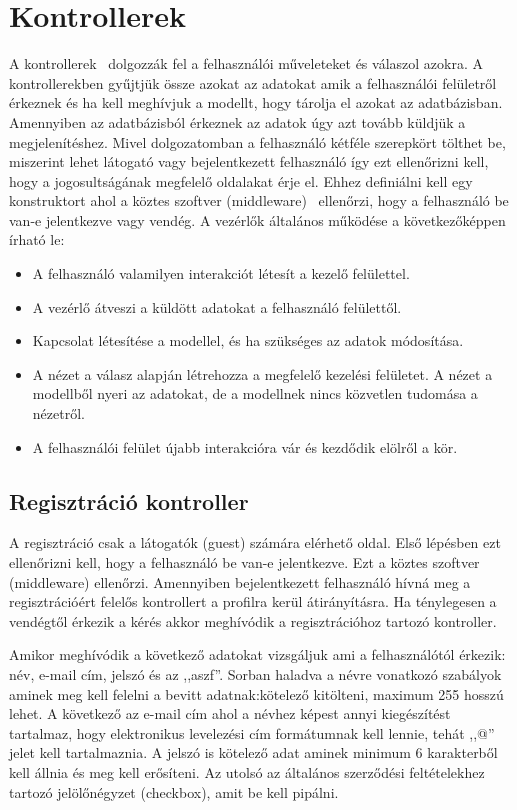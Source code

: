 \documentclass[
]{thesis-ekf}
\theoremstyle{definition}
\theoremstyle{remark}
\begin{document}
	\section{Kontrollerek}
	A kontrollerek~\cite{laravel_controller} dolgozzák fel a felhasználói műveleteket és válaszol azokra. A kontrollerekben gyűjtjük össze azokat az adatokat amik a felhasználói felületről érkeznek és ha kell meghívjuk a modellt, hogy tárolja el azokat az adatbázisban. Amennyiben az adatbázisból érkeznek az adatok úgy azt tovább küldjük a megjelenítéshez. Mivel dolgozatomban a felhasználó kétféle szerepkört tölthet be, miszerint lehet látogató vagy bejelentkezett felhasználó így ezt ellenőrizni kell, hogy a jogosultságának megfelelő oldalakat érje el. Ehhez definiálni kell egy konstruktort ahol a köztes szoftver (middleware)~\cite{laravel_middlewear} ellenőrzi, hogy a felhasználó be van-e jelentkezve vagy vendég.
	A vezérlők általános működése a következőképpen írható le:~\cite{controller_cicle}
	\begin{itemize}
		\item{A felhasználó valamilyen interakciót létesít a kezelő felülettel.}
		\item{A vezérlő átveszi a küldött adatokat a felhasználó felülettől.}
		\item{Kapcsolat létesítése a modellel, és ha szükséges az adatok módosítása.}
		\item{ A nézet a válasz alapján létrehozza a megfelelő kezelési felületet. A nézet a modellből nyeri az adatokat, de a modellnek nincs közvetlen tudomása a nézetről.}
		\item{A felhasználói felület újabb interakcióra vár és kezdődik elölről a kör.}
	\end{itemize}
	
	\subsection{Regisztráció kontroller}
	A regisztráció csak a látogatók (guest) számára elérhető oldal. Első lépésben ezt ellenőrizni kell, hogy a felhasználó be van-e jelentkezve. Ezt a köztes szoftver (middleware) ellenőrzi. Amennyiben bejelentkezett felhasználó hívná meg a regisztrációért felelős kontrollert a profilra kerül átirányításra. Ha ténylegesen a vendégtől érkezik a kérés akkor meghívódik a regisztrációhoz tartozó kontroller.  
	
	Amikor meghívódik a következő adatokat vizsgáljuk ami a felhasználótól érkezik: név, e-mail cím, jelszó és az ,,aszf''.
	Sorban haladva a névre vonatkozó szabályok aminek meg kell felelni a bevitt adatnak:kötelező kitölteni, maximum 255 hosszú lehet. A következő az e-mail cím ahol a névhez képest annyi kiegészítést tartalmaz, hogy elektronikus levelezési cím formátumnak kell lennie, tehát ,,@'' jelet kell tartalmaznia.
	A jelszó is kötelező adat aminek minimum 6 karakterből kell állnia és meg kell erősíteni. Az utolsó az általános szerződési feltételekhez tartozó jelölőnégyzet (checkbox), amit be kell pipálni.
	
\end{document}

